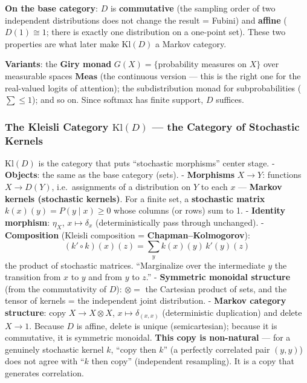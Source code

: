 \documentclass[a4paper,11pt]{article}
\begin{document}
\textbf{On the base category}: \(D\) is \textbf{commutative} (the sampling order of two independent distributions does not change the
result = Fubini) and \textbf{affine} (\(D(1)\cong 1\); there is exactly one distribution on a one-point set). These two properties are what
later make \(\mathrm{Kl}(D)\) a Markov category.

\textbf{Variants}: the \textbf{Giry monad} \(G(X)=\{\)probability measures on \(X\}\) over measurable spaces \(\mathbf{Meas}\) (the
continuous version --- this is the right one for the real-valued logits of attention); the subdistribution monad for subprobabilities
(\(\sum\le 1\)); and so on. Since softmax has finite support, \(D\) suffices.

\hypertarget{the-kleisli-category-mathrmkld-the-category-of-stochastic-kernels}{%
\subsubsection{\texorpdfstring{The Kleisli Category \(\mathrm{Kl}(D)\)
--- the Category of Stochastic Kernels}{The Kleisli Category \textbackslash mathrm\{Kl\}(D) --- the Category of Stochastic Kernels}}\label{the-kleisli-category-mathrmkld-the-category-of-stochastic-kernels}}

\(\mathrm{Kl}(D)\) is the category that puts ``stochastic morphisms'' center stage. - \textbf{Objects}: the same as the base category (sets).
- \textbf{Morphisms} \(X\to Y\): functions \(X\to D(Y)\),
i.e.~assignments of a distribution on \(Y\) to each \(x\) --- \textbf{Markov kernels (stochastic kernels)}. For a finite set, a \textbf{stochastic matrix} \(k(x)(y)=P(y\mid x)\ge0\) whose columns (or rows) sum to 1. - \textbf{Identity morphism}: \(\eta_X\),
\(x\mapsto\delta_x\) (deterministically pass through unchanged). -\textbf{Composition} (Kleisli composition = \textbf{Chapman--Kolmogorov}):
\[(k'\circ k)(x)(z)=\sum_{y}k(x)(y)\,k'(y)(z)\] the product of stochastic matrices. ``Marginalize over the intermediate \(y\) the transition from \(x\) to \(y\) and from \(y\) to \(z\).'' - \textbf{Symmetric monoidal structure} (from the commutativity of \(D\)):
\(\otimes=\) the Cartesian product of sets, and the tensor of kernels = the independent joint distribution. - \textbf{Markov category
structure}: copy \(X\to X\otimes X\), \(x\mapsto\delta_{(x,x)}\) (deterministic duplication) and delete \(X\to 1\). Because \(D\) is
affine, delete is unique (semicartesian); because it is commutative, it is symmetric monoidal. \textbf{This copy is non-natural} --- for a
genuinely stochastic kernel \(k\), ``copy then \(k\)'' (a perfectly correlated pair \((y,y)\)) does not agree with ``\(k\) then copy''
(independent resampling). It is a copy that generates correlation.
\end{document}
